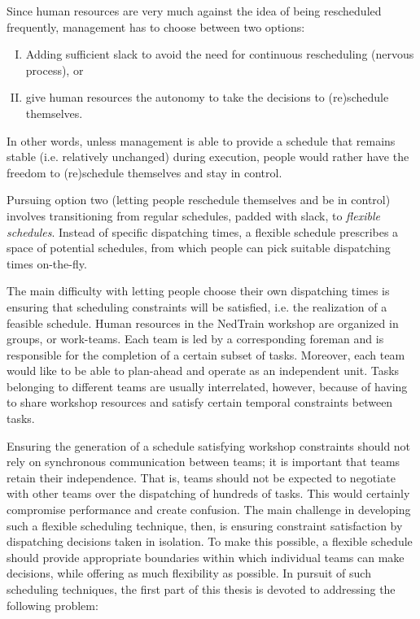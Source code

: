 		Since human resources are very much against the idea of being rescheduled frequently,
		management has to choose between two options: 
		\begin{enumerate}[(I)]
			\item Adding sufficient slack to avoid the need for continuous rescheduling (nervous process), or
			\item give human resources the autonomy to take the decisions to (re)schedule themselves.
		\end{enumerate}
		In other words, unless management is able to provide a schedule that remains stable (i.e. relatively unchanged) during execution,
		people would rather have the freedom to (re)schedule themselves and stay in control.

		Pursuing option two (letting people reschedule themselves and be in control) involves transitioning from regular schedules, 
		padded with slack, to \emph{flexible schedules}.
		Instead of specific dispatching times, 
		a flexible schedule prescribes a space of potential schedules, 
		from which people can pick suitable dispatching times on-the-fly.

		The main difficulty with letting people choose their own dispatching times is ensuring that scheduling constraints will be satisfied,
		i.e. the realization of a feasible schedule.
		Human resources in the NedTrain workshop are organized in groups, or work-teams. 
		Each team is led by a corresponding foreman and is responsible for the completion of a certain subset of tasks.
		Moreover, each team would like to be able to plan-ahead and operate as an independent unit.
		Tasks belonging to different teams are usually interrelated, however,
		because of having to share workshop resources and satisfy certain temporal constraints between tasks.

		Ensuring the generation of a schedule satisfying workshop constraints 
		should not rely on synchronous communication between teams;
		it is important that teams retain their independence.
		That is, teams should not be expected to negotiate with other teams over the dispatching of hundreds of tasks.
		This would certainly compromise performance and create confusion.
		The main challenge in developing such a flexible scheduling technique, then, 
		is ensuring constraint satisfaction by dispatching decisions taken in isolation.
		To make this possible, a flexible schedule should provide appropriate 
		boundaries within which individual teams can make decisions, 
		while offering as much flexibility as possible.
		In pursuit of such scheduling techniques, 
		the first part of this thesis is devoted to addressing the following problem:

